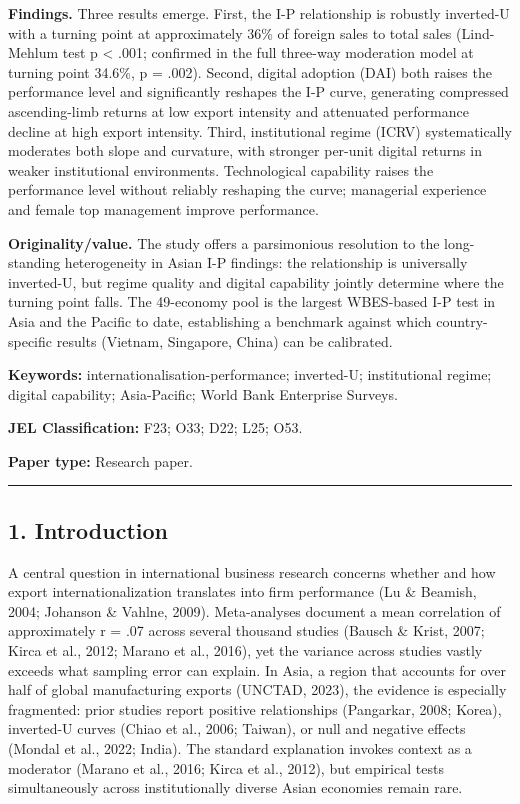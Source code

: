 \documentclass[12pt,a4paper]{article}
\begin{document}
\textbf{Findings.} Three results emerge. First, the I-P relationship is
robustly inverted-U with a turning point at approximately 36\% of
foreign sales to total sales (Lind-Mehlum test p \textless{} .001;
confirmed in the full three-way moderation model at turning point
34.6\%, p = .002). Second, digital adoption (DAI) both raises the
performance level and significantly reshapes the I-P curve, generating
compressed ascending-limb returns at low export intensity and attenuated
performance decline at high export intensity. Third, institutional
regime (ICRV) systematically moderates both slope and curvature, with
stronger per-unit digital returns in weaker institutional environments.
Technological capability raises the performance level without reliably
reshaping the curve; managerial experience and female top management
improve performance.

\textbf{Originality/value.} The study offers a parsimonious resolution
to the long-standing heterogeneity in Asian I-P findings: the
relationship is universally inverted-U, but regime quality and digital
capability jointly determine where the turning point falls. The
49-economy pool is the largest WBES-based I-P test in Asia and the
Pacific to date, establishing a benchmark against which country-specific
results (Vietnam, Singapore, China) can be calibrated.

\textbf{Keywords:} internationalisation-performance; inverted-U;
institutional regime; digital capability; Asia-Pacific; World Bank
Enterprise Surveys.

\textbf{JEL Classification:} F23; O33; D22; L25; O53.

\textbf{Paper type:} Research paper.

\begin{center}\rule{0.5\linewidth}{0.5pt}\end{center}

\hypertarget{1-introduction}{%
\subsection{1. Introduction}\label{1-introduction}}

A central question in international business research concerns whether
and how export internationalization translates into firm performance (Lu
\& Beamish, 2004; Johanson \& Vahlne, 2009). Meta-analyses document a
mean correlation of approximately r = .07 across several thousand
studies (Bausch \& Krist, 2007; Kirca et al., 2012; Marano et al.,
2016), yet the variance across studies vastly exceeds what sampling
error can explain. In Asia, a region that accounts for over half of
global manufacturing exports (UNCTAD, 2023), the evidence is especially
fragmented: prior studies report positive relationships (Pangarkar,
2008; Korea), inverted-U curves (Chiao et al., 2006; Taiwan), or null
and negative effects (Mondal et al., 2022; India). The standard
explanation invokes context as a moderator (Marano et al., 2016; Kirca
et al., 2012), but empirical tests simultaneously across institutionally
diverse Asian economies remain rare.
\end{document}
